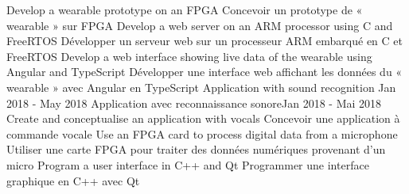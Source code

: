             \resumeItemListStart
                \resumeItemEnFr
                    {Develop a wearable prototype on an FPGA}
                    {Concevoir un prototype de « wearable » sur FPGA}
                \resumeItemEnFr
                    {Develop a web server on an ARM processor using C and FreeRTOS}
                    {Développer un serveur web sur un processeur ARM embarqué en C et FreeRTOS}
                \resumeItemEnFr
                    {Develop a web interface showing live data of the wearable using Angular and TypeScript}
                    {Développer une interface web affichant les données du « wearable » avec Angular en TypeScript}
            \resumeItemListEnd
      \resumeProjectHeadingEnFr
          {Application with sound recognition }{Jan 2018 - May 2018}
          {Application avec reconnaissance sonore}{Jan 2018 - Mai 2018}
            \resumeItemListStart
                \resumeItemEnFr
                    {Create and conceptualise an application with vocals}
                    {Concevoir une application à commande vocale}
                \resumeItemEnFr
                    {Use an FPGA card to process digital data from a microphone}
                    {Utiliser une carte FPGA pour traiter des données numériques provenant d’un micro}
                \resumeItemEnFr
                    {Program a user interface in C++ and Qt}
                    {Programmer une interface graphique en C++ avec Qt}
            \resumeItemListEnd
    \resumeSubHeadingListEnd


